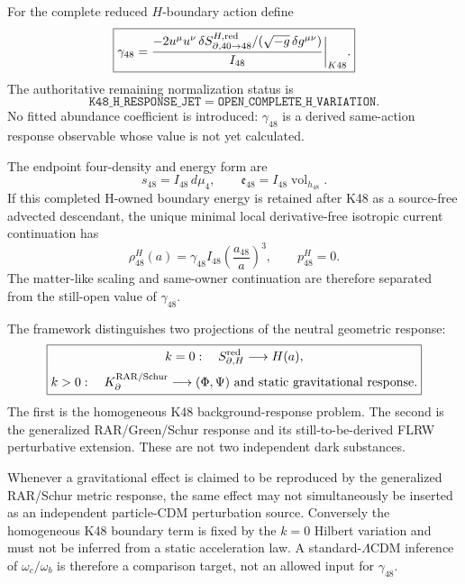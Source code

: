 \documentclass[12pt,a4paper]{article}
\begin{document}
\begin{definition}
\label{p8:def:v2141-k48-response-jet}
For the complete reduced $H$-boundary action define
\[
 \boxed{
 \gamma_{48}
 =\frac{-2u^\mu u^\nu\,
 \delta S_{\partial,40\to48}^{H,\rm red}/
 (\sqrt{-g}\,\delta g^{\mu\nu})}{I_{48}}\bigg|_{K48}.}
\]
The authoritative remaining normalization status is
\[
 \boxed{\texttt{K48\_H\_RESPONSE\_JET}=\texttt{OPEN\_COMPLETE\_H\_VARIATION}.}
\]
No fitted abundance coefficient is introduced: $\gamma_{48}$ is a derived
same-action response observable whose value is not yet calculated.
\end{definition}

\begin{corollary}
\label{p8:cor:v2141-k48-dust-continuation}
The endpoint four-density and energy form are
\[
 s_{48}=I_{48}\,d\mu_4,
 \qquad
 \mathfrak e_{48}=I_{48}\operatorname{vol}_{h_{48}}.
\]
If this completed H-owned boundary energy is retained after K48 as a
source-free advected descendant, the unique minimal local derivative-free
isotropic current continuation has
\[
 \boxed{\rho_{48}^{H}(a)
 =\gamma_{48}I_{48}\left(\frac{a_{48}}a\right)^3,
 \qquad p_{48}^{H}=0.}
\]
The matter-like scaling and same-owner continuation are therefore separated
from the still-open value of $\gamma_{48}$.
\end{corollary}

\begin{proposition}
\label{p8:prop:v2141-homogeneous-inhomogeneous-response-split}
The framework distinguishes two projections of the neutral geometric response:
\[
 \boxed{\begin{gathered}
 k=0:\quad S_{\partial,H}^{\rm red}\longrightarrow H(a),\\[2pt]
 k>0:\quad K_{\partial}^{\rm RAR/Schur}\longrightarrow
 (\Phi,\Psi)\ \text{and static gravitational response}.
 \end{gathered}}
\]
The first is the homogeneous K48 background-response problem.  The second is
the generalized RAR/Green/Schur response and its still-to-be-derived FLRW
perturbative extension.  These are not two independent dark substances.
\end{proposition}

\begin{remark}
\label{p8:rem:v2141-k48-no-double-counting}
Whenever a gravitational effect is claimed to be reproduced by the generalized
RAR/Schur metric response, the same effect may not simultaneously be inserted
as an independent particle-CDM perturbation source.  Conversely the homogeneous
K48 boundary term is fixed by the $k=0$ Hilbert variation and must not be
inferred from a static acceleration law.  A standard-$\Lambda$CDM inference of
$\omega_c/\omega_b$ is therefore a comparison target, not an allowed input for
$\gamma_{48}$.
\end{remark}
\end{document}
